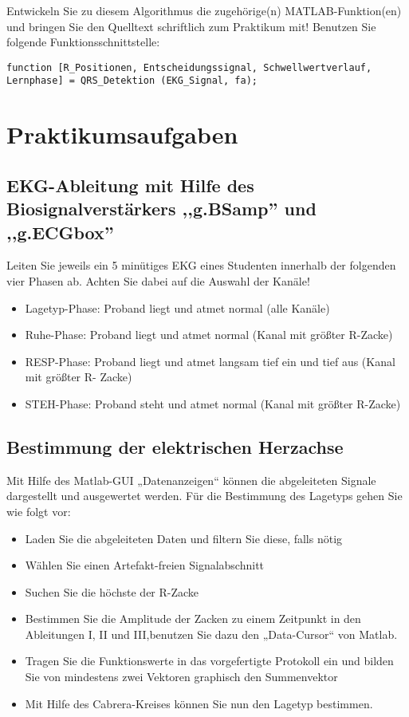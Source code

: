 \documentclass[a4paper,12pt,titlepage]{scrartcl}
\begin{document}
\subsubsection{}
Entwickeln Sie zu diesem Algorithmus die zugehörige(n) MATLAB-Funktion(en) und bringen Sie den Quelltext schriftlich zum Praktikum mit! Benutzen Sie folgende Funktionsschnittstelle:
\begin{lstlisting}[basicstyle=\tiny]
function [R_Positionen, Entscheidungssignal, Schwellwertverlauf, Lernphase] = QRS_Detektion (EKG_Signal, fa);
\end{lstlisting}

\section{Praktikumsaufgaben}
\subsection{EKG-Ableitung mit Hilfe des Biosignalverstärkers ,,g.BSamp'' und ,,g.ECGbox''}
Leiten Sie jeweils ein 5 minütiges EKG eines Studenten innerhalb der folgenden vier Phasen ab. Achten Sie dabei auf die Auswahl der Kanäle!
\begin{itemize}
    \item Lagetyp-Phase: Proband liegt und atmet normal (alle Kanäle)
    \item Ruhe-Phase: Proband liegt und atmet normal (Kanal mit größter R-Zacke)
    \item RESP-Phase: Proband liegt und atmet langsam tief ein und tief aus (Kanal mit größter R- Zacke)
    \item STEH-Phase: Proband steht und atmet normal (Kanal mit größter R-Zacke)
\end{itemize}

\subsection{Bestimmung der elektrischen Herzachse}
Mit Hilfe des Matlab-GUI „Datenanzeigen“ können die abgeleiteten Signale dargestellt und ausgewertet werden. Für die Bestimmung des Lagetyps gehen Sie wie folgt vor:
\begin{itemize}
    \item Laden Sie die abgeleiteten Daten und filtern Sie diese, falls nötig
    \item Wählen Sie einen Artefakt-freien Signalabschnitt
    \item Suchen Sie die höchste der R-Zacke
    \item Bestimmen Sie die Amplitude der Zacken zu einem Zeitpunkt in den Ableitungen I, II und III,benutzen Sie dazu den „Data-Cursor“ von Matlab.
    \item Tragen Sie die Funktionswerte in das vorgefertigte Protokoll ein und bilden Sie von mindestens zwei Vektoren graphisch den Summenvektor
    \item Mit Hilfe des Cabrera-Kreises können Sie nun den Lagetyp bestimmen.
\end{itemize}
\end{document}
